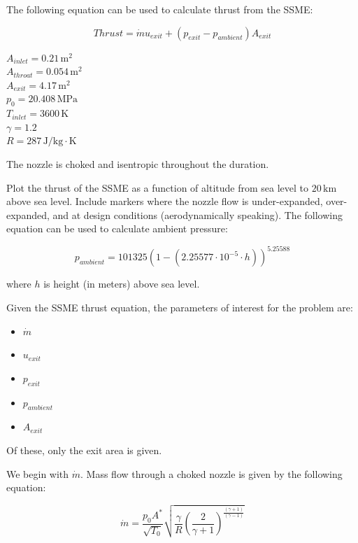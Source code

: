 \documentclass[../main.tex]{subfiles}
\begin{document}

The following equation can be used to calculate thrust from the SSME:

\[
    Thrust = \dot{m} u_{exit} + \left({p_{exit}-p_{ambient}}\right) A_{exit}  
\]

\givens{}
\(A_{inlet} = 0.21\,\unit{\meter\squared}\)\\
\(A_{throat} = 0.054\,\unit{\meter\squared}\)\\
\(A_{exit} = 4.17\,\unit{\meter\squared}\)\\
\(p_0 = 20.408\,\unit{\mega\pascal}\)\\
\(T_{inlet} = 3600\,\unit{\kelvin}\)\\
\(\gamma=1.2\)\\
\(R=287\,\unit{\joule/\kilogram\cdot\kelvin}\)

\assumptions{}
The nozzle is choked and isentropic throughout the duration.


Plot the thrust of the SSME as a function of altitude from sea level to \(20 \, \unit{\kilo\meter}\) above sea level.
Include markers where the nozzle flow is under-expanded, over-expanded, and at design conditions (aerodynamically speaking).
The following equation can be used to calculate ambient pressure:

\[
    p_{ambient} = 101325 (1 - (2.25577 \cdot 10^{-5} \cdot h))^{5.25588}
\]

where \(h\) is height (in meters) above sea level. 

\solution{}

Given the SSME thrust equation, the parameters of interest for the problem are:

\begin{itemize}

    \item \(\dot{m}\)
    \item \(u_{exit}\)
    \item \(p_{exit}\)
    \item \(p_{ambient}\)
    \item \(A_{exit}\)

\end{itemize}

Of these, only the exit area is given.

We begin with \(\dot{m}\).
Mass flow through a choked nozzle is given by the following equation:

\[
    \dot{m} = \frac{p_0 A^*}{\sqrt{T_0}} \sqrt{\frac{\gamma}{R} \left({\frac{2}{\gamma+1}}\right)^{\frac{(\gamma+1)}{(\gamma-1)}}}
\]
\end{document}
